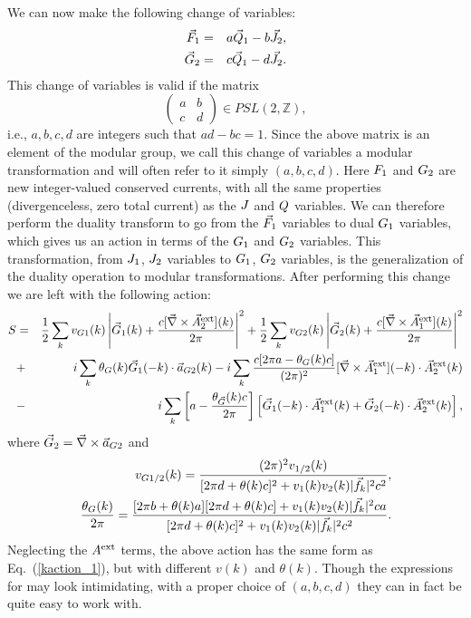 We can now make the following change of variables:\cite{Gen2Loops,FQHE}
\begin{eqnarray}
\vec{F}_1 &=& a\vec{Q}_1 - b\vec{J}_2,\\
\vec{G}_2 &=& c\vec{Q}_1 - d\vec{J}_2.
\label{modularshift}
\end{eqnarray}
This change of variables is valid if the matrix
\begin{equation}
\begin{pmatrix}
a & b \\
c & d 
\end{pmatrix}
\in PSL(2,\mathbb{Z}),
\end{equation}
i.e.,  $a,b,c,d$ are integers such that $ad-bc=1$. Since the above matrix is an element of the modular group, we call this change of variables a modular transformation and will often refer to it simply $(a,b,c,d)$. Here $F_1$ and $G_2$ are new integer-valued conserved currents, with all the same properties (divergenceless, zero total current) as the $J$ and $Q$ variables. We can therefore perform the duality transform to go from the $\vec{F}_1$ variables to dual $G_1$ variables, which gives us an action in terms of the $G_1$ and $G_2$ variables. This transformation, from $J_1$, $J_2$ variables to $G_1$, $G_2$ variables, is the generalization of the duality operation to modular transformations. After performing this change we are left with the following action:
\begin{eqnarray}
S&=&\frac{1}{2}\sum_k v_{G1}(k) \left|\vec{G}_1(k)+\frac{c[\vec{\nabla}\times\vec{A}_{2}^{\rm ext}](k)}{2\pi}\right|^2
+\frac{1}{2}\sum_k v_{G2}(k)\left|\vec{G}_2(k)+\frac{c[\vec{\nabla}\times\vec{A}_{1}^{\rm ext}](k)}{2\pi}\right|^2\nonumber\\
&+&i\sum_k \theta_{G}(k) \vec{G}_1(-k)\cdot \vec{a}_{G2}(k)
-i\sum_k \frac{c[2\pi a-\theta_{G}(k)c]}{(2\pi)^2} [\vec{\nabla}\times\vec{A}_{1}^{\rm ext}](-k)\cdot \vec{A}_{2}^{\rm ext}(k)\nonumber\\
&-& i\sum_k \left[a - \frac{\theta_{\vec{G}}(k) c}{2\pi}\right]\left[\vec{G}_1(-k) \cdot \vec{A}_{1}^{\rm ext}(k) + \vec{G}_2(-k) \cdot \vec{A}_{2}^{\rm ext}(k) \right],
\label{gaction}
\end{eqnarray}
where $\vec{G}_2=\vec{\nabla}\times \vec{a}_{G2}$ and
\begin{eqnarray}
&&\!\!\!\!\! v_{\cG1/2}(k)=\frac{(2\pi)^2v_{1/2}(k)}{[2\pi d+\theta(k) c]^2+ v_{1}(k)v_{2}(k)|\vec{f}_k|^2c^2},\label{VJ}\\
&&\!\!\!\!\! \frac{\theta_{\cG}(k)}{2\pi}=\frac{[2\pi b+\theta(k) a][2\pi d + \theta(k) c]+v_{1}(k)v_{2}(k)|\vec{f}_k|^2ca}{[2\pi d+\theta(k) c]^2+ v_{1}(k)v_{2}(k)|\vec{f}_k|^2c^2}.\label{TJ}
\end{eqnarray}
Neglecting the $A^{\rm ext}$ terms, the above action has the same form as Eq.~(\ref{kaction_1}), but with different $v(k)$ and $\theta(k)$. Though the expressions for may look intimidating, with a proper choice of $(a,b,c,d)$ they can in fact be quite easy to work with. 

